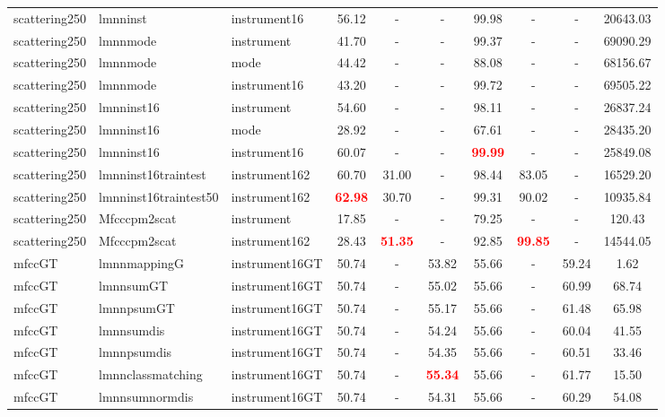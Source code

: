 \begin{tabular}{lllccccccc}
scattering250 & lmnninst & instrument16 & 56.12 &   - &   - & 99.98 &   - &   - &  20643.03 \\ 
scattering250 & lmnnmode & instrument & 41.70 &   - &   - & 99.37 &   - &   - &  69090.29 \\ 
scattering250 & lmnnmode & mode & 44.42 &   - &   - & 88.08 &   - &   - &  68156.67 \\ 
scattering250 & lmnnmode & instrument16 & 43.20 &   - &   - & 99.72 &   - &   - &  69505.22 \\ 
scattering250 & lmnninst16 & instrument & 54.60 &   - &   - & 98.11 &   - &   - &  26837.24 \\ 
scattering250 & lmnninst16 & mode & 28.92 &   - &   - & 67.61 &   - &   - &  28435.20 \\ 
scattering250 & lmnninst16 & instrument16 & 60.07 &   - &   - & \textbf{\textcolor{red}{99.99}} &   - &   - &  25849.08 \\ 
scattering250 & lmnninst16traintest & instrument162 & 60.70 & 31.00 &   - & 98.44 & 83.05 &   - &  16529.20 \\ 
scattering250 & lmnninst16traintest50 & instrument162 & \textbf{\textcolor{red}{62.98}} & 30.70 &   - & 99.31 & 90.02 &   - &  10935.84 \\ 
scattering250 & Mfcccpm2scat & instrument & 17.85 &   - &   - & 79.25 &   - &   - &    120.43 \\ 
scattering250 & Mfcccpm2scat & instrument162 & 28.43 & \textbf{\textcolor{red}{51.35}} &   - & 92.85 & \textbf{\textcolor{red}{99.85}} &   - &  14544.05 \\ 
mfccGT & lmnnmappingG & instrument16GT & 50.74 &   - & 53.82 & 55.66 &   - & 59.24 &      1.62 \\ 
mfccGT & lmnnsumGT & instrument16GT & 50.74 &   - & 55.02 & 55.66 &   - & 60.99 &     68.74 \\ 
mfccGT & lmnnpsumGT & instrument16GT & 50.74 &   - & 55.17 & 55.66 &   - & 61.48 &     65.98 \\ 
mfccGT & lmnnsumdis & instrument16GT & 50.74 &   - & 54.24 & 55.66 &   - & 60.04 &     41.55 \\ 
mfccGT & lmnnpsumdis & instrument16GT & 50.74 &   - & 54.35 & 55.66 &   - & 60.51 &     33.46 \\ 
mfccGT & lmnnclassmatching & instrument16GT & 50.74 &   - & \textbf{\textcolor{red}{55.34}} & 55.66 &   - & 61.77 &     15.50 \\ 
mfccGT & lmnnsumnormdis & instrument16GT & 50.74 &   - & 54.31 & 55.66 &   - & 60.29 &     54.08 \\ 

\end{tabular}
